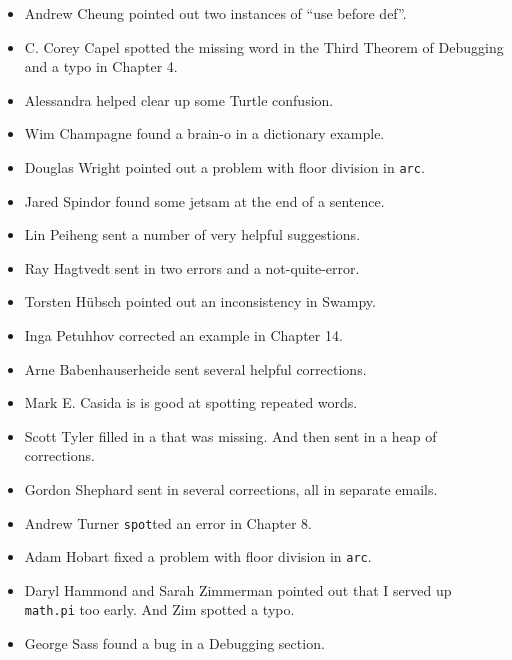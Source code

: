 \documentclass[10pt]{book}
\begin{document}
\begin{itemize}
\item Andrew Cheung pointed out two instances of ``use before def''.

\item C. Corey Capel spotted the missing word in the Third Theorem
of Debugging and a typo in Chapter 4.

\item Alessandra helped clear up some Turtle confusion.

\item Wim Champagne found a brain-o in a dictionary example.

\item Douglas Wright pointed out a problem with floor division in
{\tt arc}.

\item Jared Spindor found some jetsam at the end of a sentence.

\item Lin Peiheng sent a number of very helpful suggestions.

\item Ray Hagtvedt sent in two errors and a not-quite-error.

\item Torsten H\"{u}bsch pointed out an inconsistency in Swampy.

\item Inga Petuhhov corrected an example in Chapter 14.

\item Arne Babenhauserheide sent several helpful corrections.

\item Mark E. Casida is is good at spotting repeated words.

\item Scott Tyler filled in a that was missing.  And then sent in
a heap of corrections.

\item Gordon Shephard sent in several corrections, all in separate
emails.

\item Andrew Turner {\tt spot}ted an error in Chapter 8.

\item Adam Hobart fixed a problem with floor division in {\tt arc}.

\item Daryl Hammond and Sarah Zimmerman pointed out that I served
up {\tt math.pi} too early.  And Zim spotted a typo.

\item George Sass found a bug in a Debugging section.


\end{itemize}
\end{document}
